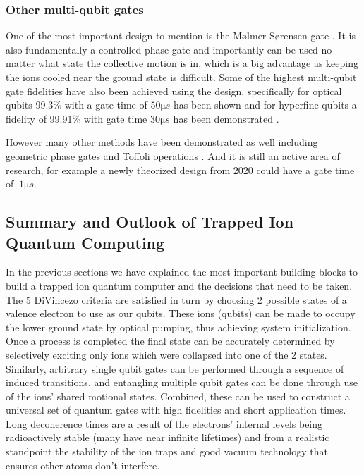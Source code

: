 \subsubsection{Other multi-qubit gates}
One of the most important design to mention is the Mølmer-Sørensen gate \cite{sorensenQuantumComputationIons1999}.
It is also fundamentally a controlled phase gate and importantly can be used no matter what state the collective motion is in, which is a big advantage as keeping the ions cooled near the ground state is difficult.
Some of the highest multi-qubit gate fidelities have also been achieved using the design, specifically for optical qubits 99.3\% with a gate time of $50\si{\micro s}$ has been shown \cite{benhelmFaulttolerantQuantumComputing2008} and for hyperfine qubits a fidelity of 99.91\% with gate time $30 \si{\micro s}$ has been demonstrated \cite{gaeblerHighFidelityUniversalGate2016}.

However many other methods have been demonstrated as well including geometric phase gates \cite{leibfriedExperimentalDemonstrationRobust2003, milburnIonTrapQuantum2000} and Toffoli operations \cite{monzRealizationQuantumToffoli2009}.
And it is still an active area of research, for example a newly theorized design from 2020 \cite{torronteguiUltrafastTwoqubitIon2020} could have a gate time of $~ 1 \si{\micro s}$.

\subsection{Summary and Outlook of Trapped Ion Quantum Computing}
In the previous sections we have explained the most important building blocks to build a trapped ion quantum computer and the decisions that need to be taken.
The 5 DiVincezo criteria are satisfied in turn by choosing 2 possible states of a valence electron to use as our qubits.
These ions (qubits) can be made to occupy the lower ground state by optical pumping, thus achieving system initialization. Once a process is completed the final state can be accurately determined by selectively exciting only ions which were collapsed into one of the 2 states.
Similarly, arbitrary single qubit gates can be performed through a sequence of induced transitions, and entangling multiple qubit gates can be done through use of the ions' shared motional states. Combined, these can be used to construct a universal set of quantum gates with high fidelities and short application times.
Long decoherence times are a result of the electrons' internal levels being radioactively stable (many have near infinite lifetimes) and from a realistic standpoint the stability of the ion traps and good vacuum technology that ensures other atoms don't interfere.

